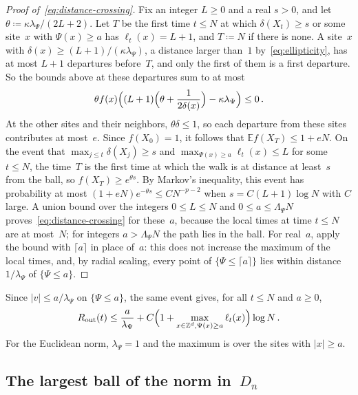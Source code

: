 \documentclass[11pt]{amsart}
\theoremstyle{plain}
\theoremstyle{definition}
\newcommand{\Z}{\mathbb Z}
\newcommand{\E}{\mathbb E}
\newcommand{\drift}{\kappa}
\newcommand{\gauge}{\Psi}
\newcommand{\Rout}{R_{\mathrm{out}}}
\numberwithin{equation}{section}
\begin{document}
\begin{proof}[Proof of~\eqref{eq:distance-crossing}]
Fix an integer $L\geq0$ and a real $s>0$, and let $\theta\coloneqq\drift \lambda_\gauge/(2L+2)$. Let $T$ be the first time $t\leq N$ at which $\delta(X_t)\geq s$ or some site~$x$ with $\gauge(x)\geq a$ has $\ell_t(x)=L+1$, and $T\coloneqq N$ if there is none. A site~$x$ with $\delta(x)\geq(L+1)/(\drift \lambda_\gauge)$, a distance larger than~$1$ by~\eqref{eq:ellipticity}, has at most $L+1$ departures before~$T$, and only the first of them is a first departure. So the bounds above at these departures sum to at most
\begin{equation*}
\theta f(x)\Bigl((L+1)\Bigl(\theta+\frac1{2\delta(x)}\Bigr)-\drift \lambda_\gauge\Bigr)\leq0\, .
\end{equation*}
At the other sites and their neighbors, $\theta\delta\leq1$, so each departure from these sites contributes at most~$e$. Since $f(X_0)=1$, it follows that $\E f(X_T)\leq1+eN$. On the event that $\max_{j\leq t}\delta(X_j)\geq s$ and $\max_{\gauge(x)\geq a}\ell_t(x)\leq L$ for some $t\leq N$, the time~$T$ is the first time at which the walk is at distance at least~$s$ from the ball, so $f(X_T)\geq e^{\theta s}$. By Markov's inequality, this event has probability at most $(1+eN)e^{-\theta s}\leq CN^{-p-2}$ when $s=C(L+1)\log N$ with $C$ large. A union bound over the integers $0\leq L\leq N$ and $0\leq a\leq\Lambda_\gauge N$ proves~\eqref{eq:distance-crossing} for these~$a$, because the local times at time $t\leq N$ are at most~$N$; for integers $a>\Lambda_\gauge N$ the path lies in the ball. For real~$a$, apply the bound with $\lceil a\rceil$ in place of~$a$: this does not increase the maximum of the local times, and, by radial scaling, every point of $\{\gauge\leq\lceil a\rceil\}$ lies within distance $1/\lambda_\gauge$ of $\{\gauge\leq a\}$.
\end{proof}

Since $|v|\leq a/\lambda_\gauge$ on $\{\gauge\leq a\}$, the same event gives, for all $t\leq N$ and $a\geq0$,
\begin{equation}\label{eq:euclid-crossing}
\Rout(t)\leq\frac a{\lambda_\gauge}+C\Bigl(1+\max_{x\in\Z^d,\gauge(x)\geq a}\ell_t(x)\Bigr)\log N\, .
\end{equation}
For the Euclidean norm, $\lambda_\gauge=1$ and the maximum is over the sites with $|x|\geq a$.

\subsection{The largest ball of the norm in~$D_n$}\label{sec:largest-ball}
\end{document}
